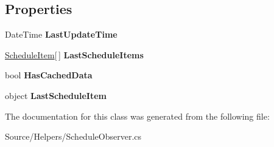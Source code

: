 \subsection*{Properties}
\begin{DoxyCompactItemize}
\item 
Date\+Time {\bfseries Last\+Update\+Time}\hypertarget{class_w_c_c_mobile_1_1_schedule_observer_a1e670ceb3c93e76eabf3b9603f9e3136}{}\label{class_w_c_c_mobile_1_1_schedule_observer_a1e670ceb3c93e76eabf3b9603f9e3136}

\item 
\hyperlink{class_w_c_c_mobile_1_1_models_1_1_schedule_item}{Schedule\+Item}\mbox{[}$\,$\mbox{]} {\bfseries Last\+Schedule\+Items}\hypertarget{class_w_c_c_mobile_1_1_schedule_observer_a0ea021f1a7c4e0d4dd0dd0f6c9364500}{}\label{class_w_c_c_mobile_1_1_schedule_observer_a0ea021f1a7c4e0d4dd0dd0f6c9364500}

\item 
bool {\bfseries Has\+Cached\+Data}\hypertarget{class_w_c_c_mobile_1_1_schedule_observer_a9e4207b94e505bb9b8fb83661942d9cd}{}\label{class_w_c_c_mobile_1_1_schedule_observer_a9e4207b94e505bb9b8fb83661942d9cd}

\item 
object {\bfseries Last\+Schedule\+Item}\hypertarget{class_w_c_c_mobile_1_1_schedule_observer_a99d10a1c554bc9c71532795d62b4c3f0}{}\label{class_w_c_c_mobile_1_1_schedule_observer_a99d10a1c554bc9c71532795d62b4c3f0}

\end{DoxyCompactItemize}


The documentation for this class was generated from the following file\+:\begin{DoxyCompactItemize}
\item 
Source/\+Helpers/Schedule\+Observer.\+cs\end{DoxyCompactItemize}
